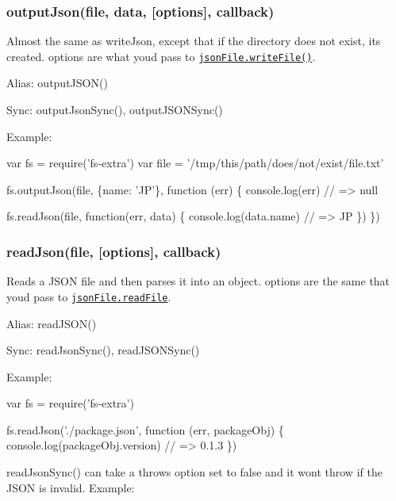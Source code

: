 \subsubsection*{output\+Json(file, data, \mbox{[}options\mbox{]}, callback)}

Almost the same as {\ttfamily write\+Json}, except that if the directory does not exist, it\textquotesingle{}s created. {\ttfamily options} are what you\textquotesingle{}d pass to \href{https://github.com/jprichardson/node-jsonfile#writefilefilename-options-callback}{\tt {\ttfamily json\+File.\+write\+File()}}.

Alias\+: {\ttfamily output\+J\+S\+O\+N()}

Sync\+: {\ttfamily output\+Json\+Sync()}, {\ttfamily output\+J\+S\+O\+N\+Sync()}

Example\+:


\begin{DoxyCode}
var fs = require('fs-extra')
var file = '/tmp/this/path/does/not/exist/file.txt'

fs.outputJson(file, \{name: 'JP'\}, function (err) \{
  console.log(err) // => null

  fs.readJson(file, function(err, data) \{
    console.log(data.name) // => JP
  \})
\})
\end{DoxyCode}


\subsubsection*{read\+Json(file, \mbox{[}options\mbox{]}, callback)}

Reads a J\+S\+ON file and then parses it into an object. {\ttfamily options} are the same that you\textquotesingle{}d pass to \href{https://github.com/jprichardson/node-jsonfile#readfilefilename-options-callback}{\tt {\ttfamily json\+File.\+read\+File}}.

Alias\+: {\ttfamily read\+J\+S\+O\+N()}

Sync\+: {\ttfamily read\+Json\+Sync()}, {\ttfamily read\+J\+S\+O\+N\+Sync()}

Example\+:


\begin{DoxyCode}
var fs = require('fs-extra')

fs.readJson('./package.json', function (err, packageObj) \{
  console.log(packageObj.version) // => 0.1.3
\})
\end{DoxyCode}


{\ttfamily read\+Json\+Sync()} can take a {\ttfamily throws} option set to {\ttfamily false} and it won\textquotesingle{}t throw if the J\+S\+ON is invalid. Example\+:


